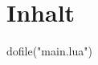\documentclass[paper=a4,ngerman,fontsize=10bp]{scrartcl}
\begin{document}
\RaggedRight

\section{Inhalt}
\begin{luacode*}
dofile("main.lua")
\end{luacode*}
\end{document}
